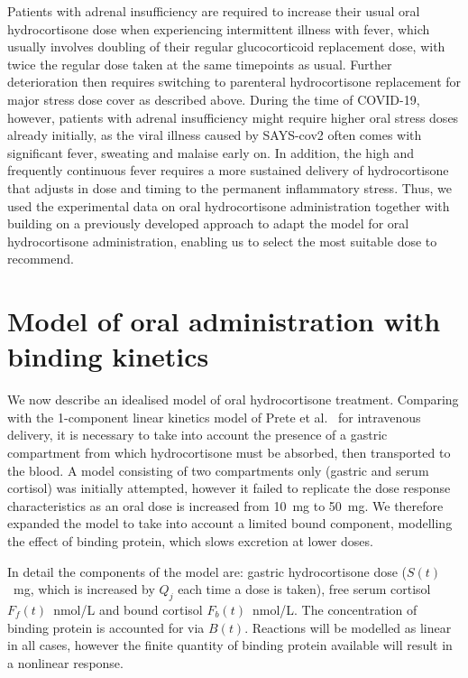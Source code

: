 \documentclass[12pt,a4paper]{article}
\begin{document}
Patients with adrenal insufficiency are required to increase their usual oral hydrocortisone dose when experiencing intermittent illness with fever, which usually involves doubling of their regular glucocorticoid replacement dose, with twice the regular dose taken at the same timepoints as usual. Further deterioration then requires switching to parenteral hydrocortisone replacement for major stress dose cover as described above. During the time of COVID-19, however, patients with adrenal insufficiency might require higher oral stress doses already initially, as the viral illness caused by SAYS-cov2 often comes with significant fever, sweating and malaise early on. In addition, the high and frequently continuous fever requires a more sustained delivery of hydrocortisone that adjusts in dose and timing to the permanent inflammatory stress. Thus, we used the experimental data on oral hydrocortisone administration \cite{prete2020} together with building on a previously developed approach \cite{bunte2018} to adapt the model for oral hydrocortisone administration, enabling us to select the most suitable dose to recommend.

\section*{Model of oral administration with binding kinetics}

We now describe an idealised model of oral hydrocortisone treatment. Comparing with the 1-component linear kinetics model of Prete et al.\ \cite{prete2020} for intravenous delivery, it is necessary to take into account the presence of a gastric compartment from which hydrocortisone must be absorbed, then transported to the blood. A model consisting of two compartments only (gastric and serum cortisol) was initially attempted, however it failed to replicate the dose response characteristics as an oral dose is increased from 10~mg to 50~mg. We therefore expanded the model to take into account a limited bound component, modelling the effect of binding protein, which slows excretion at lower doses.

In detail the components of the model are: gastric hydrocortisone dose (\(S(t)\)~mg, which is increased by \(Q_j\) each time a dose is taken), free serum cortisol \(F_f(t)\)~nmol/L and bound cortisol \(F_b(t)\)~nmol/L. The concentration of binding protein is accounted for via \(B(t)\). Reactions will be modelled as linear in all cases, however the finite quantity of binding protein available will result in a nonlinear response.
\end{document}
